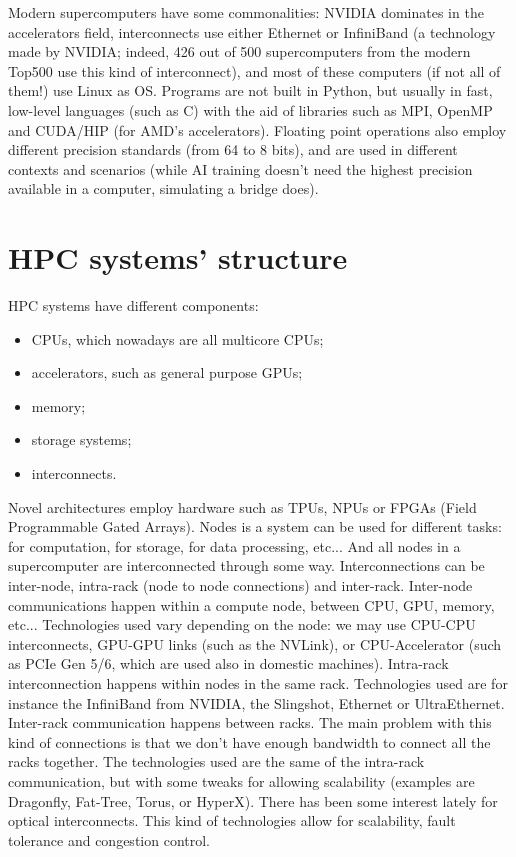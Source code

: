 \nwl
Modern supercomputers have some commonalities: NVIDIA dominates in the accelerators field, interconnects use either Ethernet or InfiniBand (a technology made by NVIDIA; indeed, 426 out of 500 supercomputers from the modern Top500 use this kind of interconnect), and most of these computers (if not all of them!) use Linux as OS.
\nwl
Programs are not built in Python, but usually in fast, low-level languages (such as C) with the aid of libraries such as MPI, OpenMP and CUDA/HIP (for AMD's accelerators). Floating point operations also employ different precision standards (from 64 to 8 bits), and are used in different contexts and scenarios (while AI training doesn't need the highest precision available in a computer, simulating a bridge does).

\section{HPC systems' structure}

HPC systems have different components:
\begin{itemize}
    \item CPUs, which nowadays are all multicore CPUs;
    \item accelerators, such as general purpose GPUs;
    \item memory;
    \item storage systems;
    \item interconnects.
\end{itemize}

Novel architectures employ hardware such as TPUs, NPUs or FPGAs (Field Programmable Gated Arrays).
\nwl
Nodes is a system can be used for different tasks: for computation, for storage, for data processing, etc... And all nodes in a supercomputer are interconnected through some way. Interconnections can be inter-node, intra-rack (node to node connections) and inter-rack. 
\nwl
Inter-node communications happen within a compute node, between CPU, GPU, memory, etc... Technologies used vary depending on the node: we may use CPU-CPU interconnects, GPU-GPU links (such as the NVLink), or CPU-Accelerator (such as PCIe Gen 5/6, which are used also in domestic machines).
\nwl
Intra-rack interconnection happens within nodes in the same rack. Technologies used are for instance the InfiniBand from NVIDIA, the Slingshot, Ethernet or UltraEthernet.
\nwl
Inter-rack communication happens between racks. The main problem with this kind of connections is that we don't have enough bandwidth to connect all the racks together. The technologies used are the same of the intra-rack communication, but with some tweaks for allowing scalability (examples are Dragonfly, Fat-Tree, Torus, or HyperX). There has been some interest lately for optical interconnects. This kind of technologies allow for scalability, fault tolerance and congestion control.

